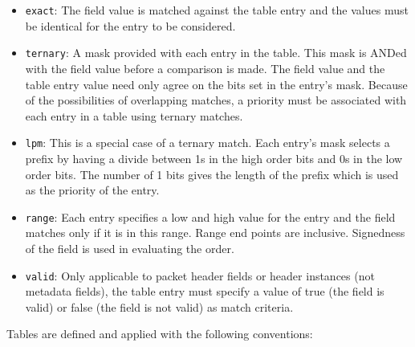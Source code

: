 \documentclass[12pt]{article}
\begin{document}
\begin{itemize}
\item
\texttt{exact}: The field value is matched against the table entry and the values 
must be identical for the entry to be considered.
\item
\texttt{ternary}:  A mask provided with each entry in the table. This mask is ANDed 
with the field value before a comparison is made.  The field value and the 
table entry value need only agree on the bits set in the entry's mask.  Because 
of the possibilities of overlapping matches, a priority must be associated 
with each entry in a table using ternary matches.
\item
\texttt{lpm}:  This is a special case of a ternary match. Each entry's mask selects 
a prefix by having a divide between 1s in the high order bits and 0s in the 
low order bits. The number of 1 bits gives the length of the prefix which 
is used as the priority of the entry.
\item
\texttt{range}: Each entry specifies a low and high value for the entry and the field 
matches only if it is in this range. Range end points are inclusive. Signedness 
of the field is used in evaluating the order.
\item
\texttt{valid}: Only applicable to packet header fields or header instances (not metadata 
fields), the table entry must specify a value of true (the field is valid) 
or false (the field is not valid) as match criteria.
\end{itemize}


Tables are defined and applied with the following conventions:
\end{document}
